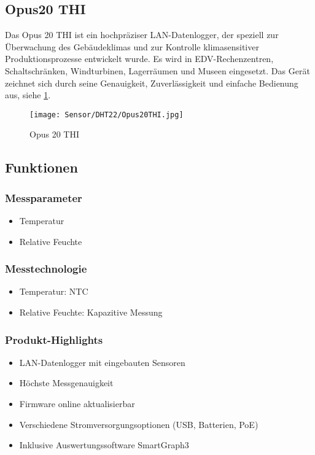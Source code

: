 \subsection{Opus20 THI} 

Das Opus 20 THI ist ein hochpräziser LAN-Datenlogger, der speziell zur Überwachung des Gebäudeklimas und zur Kontrolle klimasensitiver Produktionsprozesse entwickelt wurde. Es wird in EDV-Rechenzentren, Schaltschränken, Windturbinen, Lagerräumen und Museen eingesetzt. Das Gerät zeichnet sich durch seine Genauigkeit, Zuverlässigkeit und einfache Bedienung aus, siehe \ref{fig:Opus20THI}.

\begin{figure}[H]
    \centering
    \texttt{[image: Sensor/DHT22/Opus20THI.jpg]}
    \caption{Opus 20 THI}
    \label{fig:Opus20THI}
\end{figure}

\subsection{Funktionen}

\subsubsection{Messparameter}

\begin{itemize}
    \item Temperatur
    \item Relative Feuchte
\end{itemize}

\subsubsection{Messtechnologie}

\begin{itemize}
    \item Temperatur: NTC 
    \item Relative Feuchte: Kapazitive Messung
\end{itemize}

\subsubsection{Produkt-Highlights}

\begin{itemize}
    \item LAN-Datenlogger mit eingebauten Sensoren
    \item Höchste Messgenauigkeit
    \item Firmware online aktualisierbar
    \item Verschiedene Stromversorgungsoptionen (USB, Batterien, PoE)
    \item Inklusive Auswertungssoftware SmartGraph3
\end{itemize}

